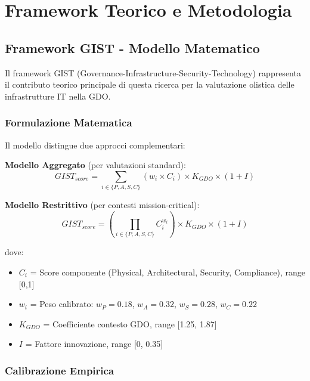 \appendix
\chapter{\texorpdfstring{Framework Teorico e Metodologia}{Appendice A - Framework Teorico e Metodologia}}

\section{\texorpdfstring{Framework GIST - Modello Matematico}{A.1 - Framework GIST - Modello Matematico}}

Il framework GIST (Governance-Infrastructure-Security-Technology) rappresenta il contributo teorico principale di questa ricerca per la valutazione olistica delle infrastrutture IT nella GDO.

\subsection{\texorpdfstring{Formulazione Matematica}{A.1.1 - Formulazione Matematica}}

Il modello distingue due approcci complementari:

\textbf{Modello Aggregato} (per valutazioni standard):
\begin{equation}
GIST_{score} = \sum_{i \in \{P,A,S,C\}} (w_i \times C_i) \times K_{GDO} \times (1+I)
\end{equation}

\textbf{Modello Restrittivo} (per contesti mission-critical):
\begin{equation}
GIST_{score} = \left(\prod_{i \in \{P,A,S,C\}} C_i^{w_i}\right) \times K_{GDO} \times (1+I)
\end{equation}

dove:
\begin{itemize}
    \item $C_i$ = Score componente (Physical, Architectural, Security, Compliance), range [0,1]
    \item $w_i$ = Peso calibrato: $w_P = 0.18$, $w_A = 0.32$, $w_S = 0.28$, $w_C = 0.22$
    \item $K_{GDO}$ = Coefficiente contesto GDO, range [1.25, 1.87]
    \item $I$ = Fattore innovazione, range [0, 0.35]
\end{itemize}

\subsection{\texorpdfstring{Calibrazione Empirica}{A.1.2 - Calibrazione Empirica}}


